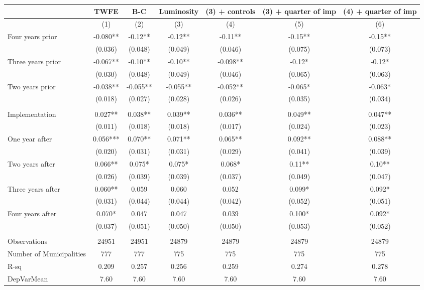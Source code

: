 \begin{tabular}{lcccccc}
\toprule
      & TWFE  & B-C   & Luminosity & (3) + controls & (3) + quarter of imp & (4) + quarter of imp \\
\midrule
      & (1)   & (2)   & (3)   & (4)   & (5)   & (6) \\
\midrule
\midrule
Four years prior & -0.080** & -0.12** & -0.12** & -0.11** & -0.15** & -0.15** \\
      & (0.036) & (0.048) & (0.049) & (0.046) & (0.075) & (0.073) \\
Three years prior & -0.067** & -0.10** & -0.10** & -0.098** & -0.12* & -0.12* \\
      & (0.030) & (0.048) & (0.049) & (0.046) & (0.065) & (0.063) \\
Two years prior & -0.038** & -0.055** & -0.055** & -0.052** & -0.065* & -0.063* \\
      & (0.018) & (0.027) & (0.028) & (0.026) & (0.035) & (0.034) \\
      &       &       &       &       &       &  \\
Implementation & 0.027** & 0.038** & 0.039** & 0.036** & 0.049** & 0.047** \\
      & (0.011) & (0.018) & (0.018) & (0.017) & (0.024) & (0.023) \\
One year after & 0.056*** & 0.070** & 0.071** & 0.065** & 0.092** & 0.088** \\
      & (0.020) & (0.031) & (0.031) & (0.029) & (0.041) & (0.039) \\
Two years after & 0.066** & 0.075* & 0.075* & 0.068* & 0.11** & 0.10** \\
      & (0.026) & (0.039) & (0.039) & (0.037) & (0.049) & (0.047) \\
Three years after & 0.060** & 0.059 & 0.060 & 0.052 & 0.099* & 0.092* \\
      & (0.031) & (0.044) & (0.044) & (0.042) & (0.052) & (0.051) \\
Four years after & 0.070* & 0.047 & 0.047 & 0.039 & 0.100* & 0.092* \\
      & (0.037) & (0.051) & (0.050) & (0.050) & (0.053) & (0.052) \\
      &       &       &       &       &       &  \\
\midrule
Observations & 24951 & 24951 & 24879 & 24879 & 24879 & 24879 \\
Number of Municipalities & 777   & 777   & 775   & 775   & 775   & 775 \\
R-sq  & 0.209 & 0.257 & 0.256 & 0.259 & 0.274 & 0.278 \\
DepVarMean & 7.60  & 7.60  & 7.60  & 7.60  & 7.60  & 7.60 \\
\bottomrule
\bottomrule
\end{tabular}%

